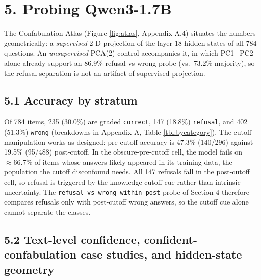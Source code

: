 \section{5. Probing Qwen3-1.7B}\label{probing-qwen3-1.7b}

The Confabulation Atlas (Figure \ref{fig:atlas}, Appendix A.4) situates
the numbers geometrically: a \emph{supervised} 2-D projection of the
layer-18 hidden states of all 784 questions. An \emph{unsupervised}
PCA(2) control accompanies it, in which PC1+PC2 alone already support an
\(86.9\%\) refusal-vs-wrong probe (vs.~\(73.2\%\) majority), so the
refusal separation is not an artifact of supervised projection.

\subsection{5.1 Accuracy by stratum}\label{accuracy-by-stratum}

Of 784 items, 235 (30.0\%) are graded \texttt{correct}, 147 (18.8\%)
\texttt{refusal}, and 402 (51.3\%) \texttt{wrong} (breakdowns in
Appendix A, Table \ref{tbl:bycategory}). The cutoff manipulation works
as designed: pre-cutoff accuracy is 47.3\% (140/296) against 19.5\%
(95/488) post-cutoff. In the obscure-pre-cutoff cell, the model fails on \(\approx 66.7\%\) of items whose answers likely appeared in its training data, the population the cutoff
disconfound needs. All 147 refusals fall in the post-cutoff cell, so
refusal is triggered by the knowledge-cutoff cue rather than intrinsic
uncertainty. The \texttt{refusal\_vs\_wrong\_within\_post} probe of
Section 4 therefore compares refusals only with post-cutoff wrong
answers, so the cutoff cue alone cannot separate the classes.

\subsection{5.2 Text-level confidence, confident-confabulation case
studies, and hidden-state geometry}\label{text-level-confidence}

